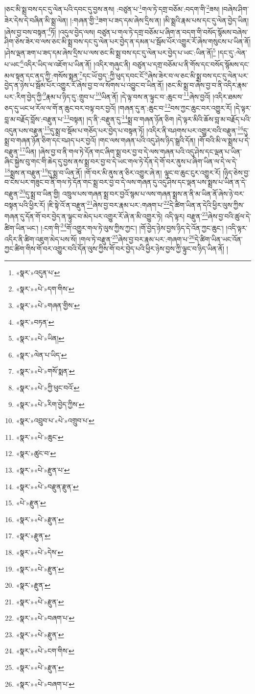 །ཅང་མི་སྨྲ་བས་དང་དུ་ལེན་པའི་དབང་དུ་བྱས་ནས། :བཙུན་པ་\footnote{«སྣར་»འདུན་པ་}གལ་ཏེ་དགྲ་བཅོམ་:བདག་གི་\footnote{«སྣར་»«པེ་»དག་གིས་}ཟས། །བཞེས་ཤིག་ཟེར་དེས་དེ་བཞིན་མི་སྨྲ་ལེན། །:གཞན་གྱི་\footnote{«སྣར་»«པེ་»གཞན་གྱིས་}ཟག་པ་ཟད་དམ་ཞེས་དྲིས་ན། །མི་སྨྲའི་རྣམ་པས་དང་དུ་ལེན་བྱེད་ཡིན། །ཞེས་བྱ་བས་བསྟན་\footnote{«སྣར་»བཏན་}ཏོ། །འདུལ་བྱེད་ལས། བཙུན་པ་གལ་ཏེ་དགྲ་བཅོམ་པ་ཞིག་ན་བདག་གི་བསོད་སྙོམས་བཞེས་ཤིག་ཅེས་ཟེར་བ་ལས་ཅང་མི་སྨྲ་བས་དང་དུ་ལེན་པར་བྱེད་ན་དམན་པ་སྦོམ་པོར་འགྱུར་རོ་ཞེས་གསུངས་པ་ཡིན་ནོ། །ཤེས་ལྡན་ཟག་པ་ཟད་དམ་ཞེས་དྲིས་པ་ལས་ཅང་མི་སྨྲ་བས་དང་དུ་ལེན་པར་བྱེད་པ་ཡང་:ཡིན་ནོ།\footnote{«སྣར་»«པེ་»ཡིན།} །དང་དུ་:ལེན་པ་ཡང་\footnote{«སྣར་»ལེན་པ་ཡིད་}འདིར་ཡིད་ལ་འཇོག་པ་ཡིན་ནོ། །འདིར་གཞུང་ནི། བཙུན་པ་དགྲ་བཅོམ་པ་ནི་གོས་དང་བསོད་སྙོམས་དང་མལ་སྟན་དང་ནད་ཀྱི་:གསོས་སྨན་\footnote{«སྣར་»«པེ་»གསོ་སྨན་}དང་ཡོ་བྱད་:ཀྱི་ཕུད་དབང་ངོ་\footnote{«སྣར་»«པེ་»ཀྱི་ཕུང་བའོ་}ཞེས་ཟེར་བ་ལ་ཅང་མི་སྨྲ་བས་དང་དུ་ལེན་པར་བྱེད་ན་ཉེས་པ་སྦོམ་པོར་འགྱུར་རོ་ཞེས་བྱ་བ་ལ་སོགས་པ་འབྱུང་བ་ཡིན་ནོ། །ཅང་མི་སྨྲ་བ་ཞེས་བྱ་བ་ནི་འདིར་རྣམ་པར་:རིག་བྱེད་ཀྱི་\footnote{«སྣར་»«པེ་»རིག་བྱེད་ཀྱིས་}རྣམ་པ་ཉིད་དུ་:གྲུབ་པ་\footnote{«སྣར་»འབྲུབ་པ་«པེ་»འགྲུབ་པ་}ཡིན་ནོ། །དེ་ལྟ་བས་ན་ལྟུང་བ་:ཆུང་བ་\footnote{«སྣར་»«པེ་»ཆུང་}ཞེས་བྱའོ། །འདིར་ཐམས་ཅད་དུ་ཡང་ཕ་རོལ་ལ་གོ་ན་ཆུང་བར་བལྟ་བར་བྱའོ། །གཞན་དུ་ན་:ཆུང་བ་\footnote{«སྣར་»ཚུང་བ་}བས་ཀྱང་ཆུང་བར་འགྱུར་རོ། །དེ་ལྟར་བླ་མ་བརྗོད་བློས་:བརྫུན་པ་\footnote{«སྣར་»«པེ་»རྫུན་པ་}བསྟན། །ད་ནི་:བརྫུན་དུ་\footnote{«སྣར་»«པེ་»བརྫུན་རྫུན་}སྨྲ་བ་གཞན་ཉོན་ཅིག །དེ་ལྟར་མིའི་ཆོས་བླ་མ་བརྗོད་པའི་འདུན་པས་བརྫུན་\footnote{«པེ་»རྫུན་}དུ་སྨྲ་བ་སྡོམ་པ་གཅོད་པར་བྱེད་པ་བསྟན་ཏོ། །འདིར་ནི་བཤགས་པར་འགྱུར་བའི་བརྫུན་\footnote{«སྣར་»«པེ་»རྫུན་}དུ་སྨྲ་བ་གཞན་ཉོན་ཅིག་དང་བཤད་པར་བྱའོ། །གང་ལས་གཞན་པའི་འདུ་ཤེས་ཉིད་སྒྲའི་དོན། །གོ་བའི་མི་ལ་སྨྲས་པ་དེ་བརྫུན་\footnote{«སྣར་»རྫུན་}ཡིན། །ཞེས་བྱ་བ་ནི་གལ་ཏེ་དོན་གང་ཞིག་སྨྲ་བར་བྱ་བ་དེ་ལས་གཞན་པའི་འདུ་ཤེས་དང་ལྡན་པ་ཡིན་ཞིང་སྐྱེས་བུ་གང་གི་ཆེད་དུ་བྱས་ནས་སྨྲ་བར་བྱ་བ་དེ་ཡང་གལ་ཏེ་དོན་དེ་གོ་བར་ནུས་པ་ཞིག་ཡིན་ལ་དེ་ལ་དེ་\footnote{«སྣར་»«པེ་»དེས་}སྨྲས་ན་བརྫུན་\footnote{«སྣར་»«པེ་»རྫུན་}དུ་སྨྲ་བ་ཡིན་ནོ། །གོ་བར་མི་ནུས་ན་ཅིར་འགྱུར་ཞེ་ན། ལྟུང་བ་ཆུང་ངུར་འགྱུར་རོ། །ཉིད་ཅེས་བྱ་བ་ངེས་པར་གཟུང་བ་ནི་གལ་ཏེ་དོན་གང་སྨྲ་བར་བྱ་བ་དེ་ལས་གཞན་དུ་འདུ་ཤེས་དང་ལྡན་པས་སྨྲས་པ་ཡིན་ན་དེ་བརྫུན་\footnote{«སྣར་»རྫུན་}དུ་སྨྲ་བ་ཡིན་གྱི། འཁྲུལ་པས་གཞན་སྨྲ་བར་བྱའོ་སྙམ་པ་ལས་གཞན་སྨྲས་ན་ནི་མ་ཡིན་ནོ་ཞེས་ཉེ་བར་བསྟན་པའི་ཕྱིར་རོ། །ཇི་སྟེ་འོ་ན་བརྫུན་\footnote{«སྣར་»«པེ་»རྫུན་}ཞེས་བྱ་བར་རྣམ་པར་:གཞག་པ་\footnote{«སྣར་»«པེ་»བཞག་པ་}དེ་ཚིག་ཡིན་ན་དེའི་ཕྱིར་ལུས་ཀྱིས་གཞན་དུ་དོན་གོ་བར་བྱེད་ན་ལྟུང་བ་མེད་པར་འགྱུར་རོ་ཞེ་ན་མི་འགྱུར་ཏེ། འདི་ལྟར། བརྫུན་\footnote{«སྣར་»«པེ་»རྫུན་}ཞེས་བྱ་བའི་ཚུལ་དེ་ཚིག་ཡིན་ཡང་། །:ངག་གི་\footnote{«སྣར་»«པེ་»ངག་གིས་}གོ་འགྱུར་གལ་ཏེ་ལུས་ཀྱིས་ཀྱང་། །གོ་བྱེད་ཉེས་བྱས་ཉིད་དེ་འོན་ཀྱང་ཆུང་། །འདི་ལྟར་འདིར་ནི་ཚིག་འཇུག་མེད་པས་སོ། །གལ་ཏེ་བརྫུན་\footnote{«སྣར་»«པེ་»རྫུན་}ཞེས་བྱ་བར་རྣམ་པར་:གཞག་པ་\footnote{«སྣར་»«པེ་»བཞག་པ་}དེ་ཚིག་ཡིན་ཡང་འོན་ཀྱང་ཚིག་གིས་གོ་བར་འགྱུར་བའི་དོན་ལུས་ཀྱིས་གོ་བར་བྱེད་པའི་ཕྱིར་ཉེས་བྱས་ཀྱི་ལྟུང་བ་ཉིད་ཡིན་ནོ། །
